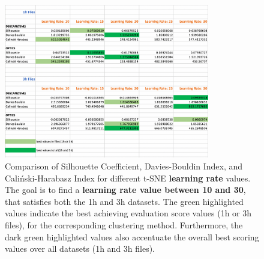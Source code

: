 \begin{figure}
  \centering
  \includegraphics[width=0.8\textwidth]{./images/tsneParametersTest/learningRate/learningRateEvaluationScoresDetailed3.png}
  \caption{Comparison of Silhouette Coefficient, Davies-Bouldin Index, and Caliński-Harabasz Index for different t-SNE \textbf{learning rate} values. The goal is to find a \textbf{learning rate value between 10 and 30}, that satisfies both the 1h and 3h datasets. The green highlighted values indicate the best achieving evaluation score values (1h or 3h files), for the corresponding clustering method. Furthermore, the dark green highlighted values also accentuate the overall best scoring values over all datasets (1h and 3h files).}
  \label{figure:learningRateEvaluationScoresDetailed3}
\end{figure}



